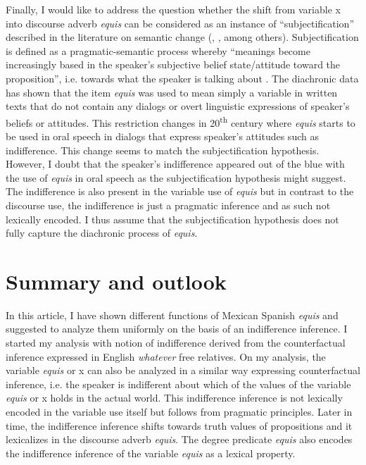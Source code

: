 \documentclass[output=paper]{langsci/langscibook}
\begin{document}
Finally, I would like to address the question whether the shift from variable x into discourse adverb \textit{equis} can be considered as an instance of “subjectification” described in the literature on semantic change (\citealt{Traugott1995}, \citealt{Company2003}, among others). Subjectification is defined as a pragmatic-semantic process whereby “meanings become increasingly based in the speaker’s subjective belief state/attitude toward the proposition”, i.e. towards what the speaker is talking about \citep[31]{Traugott1995}. The diachronic data has shown that the item \textit{equis} was used to mean simply a variable in written texts that do not contain any dialogs or overt linguistic expressions of speaker’s beliefs or attitudes. This restriction changes in 20\textsuperscript{th} century where \textit{equis} starts to be used in oral speech in dialogs that express speaker’s attitudes such as indifference. This change seems to match the subjectification hypothesis. However, I doubt that the speaker’s indifference appeared out of the blue with the use of \textit{equis} in oral speech as the subjectification hypothesis might suggest. The indifference is also present in the variable use of \textit{equis} but in contrast to the discourse use, the indifference is just a pragmatic inference and as such not lexically encoded. I thus assume that the subjectification hypothesis does not fully capture the diachronic process of \textit{equis}.

\section{Summary and outlook}\label{sec:kellert:6}
In this article, I have shown different functions of Mexican Spanish \textit{equis} and suggested to analyze them uniformly on the basis of an indifference inference. I started my analysis with  notion of indifference derived from the counterfactual inference expressed in English \textit{whatever} free relatives. On my analysis, the variable \textit{equis} or x can also be analyzed in a similar way expressing counterfactual inference, i.e. the speaker is indifferent about which of the values of the variable \textit{equis} or x holds in the actual world. This indifference inference is not lexically encoded in the variable use itself but follows from pragmatic principles. Later in time, the indifference inference shifts towards truth values of propositions and it lexicalizes in the discourse adverb \textit{equis}. The degree predicate \textit{equis} also encodes the indifference inference of the variable \textit{equis} as a lexical property.
\end{document}
